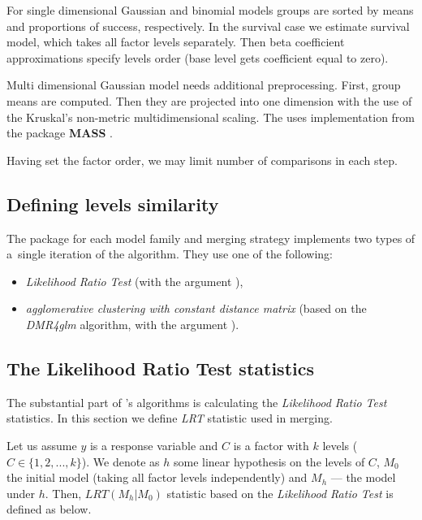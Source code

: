 For single dimensional Gaussian and binomial models groups are sorted by means and proportions of success, respectively. In the survival case we estimate survival model, which takes all factor levels separately. Then beta coefficient approximations specify levels order (base level gets coefficient equal to zero). 

Multi dimensional Gaussian model needs additional preprocessing. First, group means are computed. Then they are projected into one dimension with the use of the Kruskal's non-metric multidimensional scaling. The \factorMerger uses  implementation from the package \textbf{MASS} \citep{MASS}. 

Having set the factor order, we may limit number of comparisons in each step.



\subsection{Defining levels similarity}

The \factorMerger package for each model family and merging strategy implements two types of a~single iteration of the algorithm. They use one of the following:

\begin{itemize}

\item \emph{Likelihood Ratio Test} (with the argument ),
\item \emph{agglomerative clustering with constant distance matrix} (based on the \emph{DMR4glm} algorithm, with the argument ). 

\end{itemize}


\subsection{The Likelihood Ratio Test statistics}

The substantial part of \factorMergerTitle 's algorithms is calculating the \emph{Likelihood Ratio Test} statistics. In this section we define \emph{LRT} statistic used in merging.

Let us assume $y$ is a response variable and $C$ is a factor with $k$ levels ($C \in \{1, 2, ..., k \}$). We denote as $h$ some linear hypothesis on the levels of $C$, $M_0$ the initial model (taking all factor levels independently) and $M_h$ --- the model under $h$. Then, $LRT(M_h|M_0)$ statistic based on the \emph{Likelihood Ratio Test} is defined as below.

